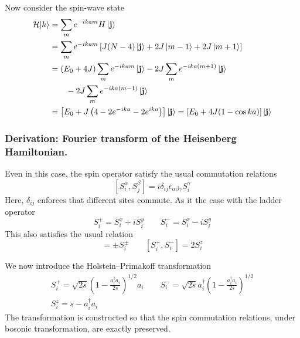 \documentclass[../../../main.tex]{subfiles}
\begin{document}
Now consider the spin-wave state
\begin{align*}
    \mathcal{H}|k\rangle
     & =  \sum_m e^{-ikam} {H}\ket{\mathbf{j}}                                                    \\
     & =  \sum_{m} e^{-ikam} \left[J(N-4) \ket{\mathbf{j}} +2J \ket{m-1}+ 2J \ket{m+1} \right]    \\
     & =  (E_0+4J)\sum_{m} e^{-ikam} \ket{\mathbf{j}} - 2J \sum_{m} e^{-ika(m+1)}\ket{\mathbf{j}}
    \\ &\qquad - 2J \sum_{m} e^{-ika(m-1)}\ket{\mathbf{j}} \\
     & = \left[ E_0  + J \left(4 - 2e^{-ika} - 2e^{ika} \right) \right]  \ket{\mathbf{j}}
    = \left[ E_0 +4J(1- \cos ka) \right] \ket{\mathbf{j}}
\end{align*}


\subsubsection{Derivation: Fourier transform of the Heisenberg Hamiltonian.}
Even in this case, the spin operator satisfy the usual commutation relations
\begin{equation*}
    \left[S_i^{\alpha}, S_j^{\beta}\right] = i \delta_{ij} \epsilon_{\alpha\beta\gamma} S_i^{\gamma}
\end{equation*}
Here, $\delta_{ij }$ enforces that different sites commute.
As it the case with the ladder operator
\begin{equation*}
    S_i^{+} = S_i^{x} + iS_i^{y}
    \qquad S_i^{-} = S_i^{x} - iS_i^{y}
\end{equation*}
This also satisfies the usual relation
\begin{equation*}
    [S_i^z, S_i^\pm] = \pm S_i^\pm\qquad
    [S_i^+, S_i^-] = 2S_i^z
\end{equation*}

We now introduce the Holstein–Primakoff transformation
\begin{gather*}
    S_i^+ = \sqrt{2s}\left(1-\frac{a_i^\dagger a_i}{2s}\right)^{1/2}a_i\qquad
    S_i^- = \sqrt{2s}a_i^\dagger\left(1-\frac{a_i^\dagger a_i}{2s}\right)^{1/2}\\
    S_i^z = s-a_i^\dagger a_i
\end{gather*}
The transformation is constructed so that the spin commutation relations, under bosonic transformation, are exactly preserved.
\end{document}
